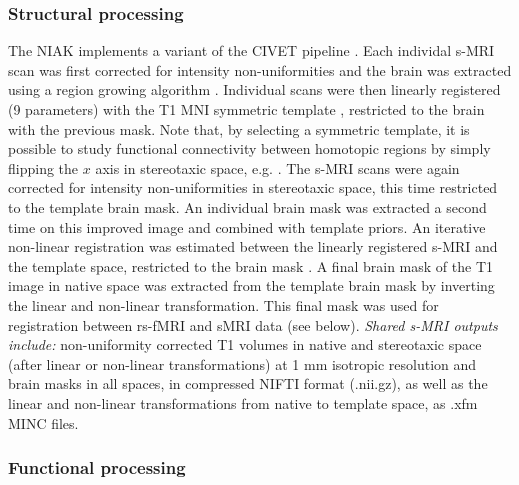 \documentclass[preprint,12pt,3p]{elsarticle}
\begin{document}
\subsubsection{Structural processing} The NIAK implements a variant of the CIVET pipeline \cite{ad2006civet}. Each individal s-MRI scan was first corrected for intensity non-uniformities \cite{sled1998nonparametric} and the brain was extracted using a region growing algorithm \cite{park2009skull}. Individual scans were then linearly registered (9 parameters) with the T1 MNI symmetric template \cite{fonov2011unbiased}, restricted to the brain with the previous mask. Note that, by selecting a symmetric template, it is possible to study functional connectivity between homotopic regions by simply flipping the $x$ axis in stereotaxic space, e.g. \cite{VMHCpap}. The s-MRI scans were again corrected for intensity non-uniformities in stereotaxic space, this time restricted to the template brain mask. An individual brain mask was extracted a second time on this improved image \cite{park2009skull} and combined with template priors. An iterative non-linear registration was estimated between the linearly registered s-MRI and the template space, restricted to the brain mask \cite{collins1994automatic}. A final brain mask of the T1 image in native space was extracted from the template brain mask by inverting the linear and non-linear transformation. This final mask was used for registration between rs-fMRI and sMRI data (see below). \emph{Shared s-MRI outputs include:} non-uniformity corrected T1 volumes in native and stereotaxic space (after linear or non-linear transformations) at 1 mm isotropic resolution and brain masks in all spaces, in compressed NIFTI format (.nii.gz), as well as the linear and non-linear transformations from native to template space, as .xfm MINC files. 

\subsubsection{Functional processing} 
\end{document}
